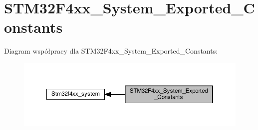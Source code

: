 \hypertarget{group___s_t_m32_f4xx___system___exported___constants}{}\section{S\+T\+M32\+F4xx\+\_\+\+System\+\_\+\+Exported\+\_\+\+Constants}
\label{group___s_t_m32_f4xx___system___exported___constants}
Diagram współpracy dla S\+T\+M32\+F4xx\+\_\+\+System\+\_\+\+Exported\+\_\+\+Constants\+:\nopagebreak
\begin{figure}[H]
\begin{center}
\leavevmode
\includegraphics[width=350pt]{group___s_t_m32_f4xx___system___exported___constants}
\end{center}
\end{figure}
